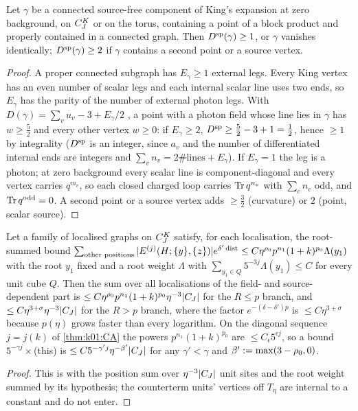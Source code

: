 \begin{lemma}\label{lem:a02:BLK}
Let $\gamma$ be a connected source-free component of King's expansion at zero background, on $C^{K}_{J}$ or on the torus, containing a point of a block product and properly contained in a connected graph. Then $D^{\mathrm{sp}}(\gamma)\ge1$, or $\gamma$ vanishes identically; $D^{\mathrm{sp}}(\gamma)\ge2$ if $\gamma$ contains a second point or a source vertex.
\end{lemma}
\begin{proof}
A proper connected subgraph has $E_\gamma\ge1$ external legs. Every King vertex has an even number of scalar legs and each internal scalar line uses two ends, so $E_\gamma$ has the parity of the number of external photon legs. With $D(\gamma)=\sum_vu_v-3+E_\gamma/2$ \cite[(3.30)--(3.31)]{K1}, a point with a photon field whose line lies in $\gamma$ has $w\ge\frac52$ and every other vertex $w\ge0$: if $E_\gamma\ge2$, $D^{\mathrm{sp}}\ge\frac52-3+1=\frac12$, hence $\ge1$ by integrality ($D^{\mathrm{sp}}$ is an integer, since $a_v$ and the number of differentiated internal ends are integers and $\sum_vn_v=2\#\text{lines}+E_\gamma$). If $E_\gamma=1$ the leg is a photon; at zero background every scalar line is component-diagonal and every vertex carries $q^{m_v}$, so each closed charged loop carries $\operatorname{Tr} q^{n_c}$ with $\sum_cn_c$ odd, and $\operatorname{Tr} q^{\mathrm{odd}}=0$. A second point or a source vertex adds $\ge\frac32$ (curvature) or $2$ (point, scalar source).
\end{proof}

\begin{lemma}\label{lem:a02:SC}
Let a family of localised graphs on $C^{K}_{J}$ satisfy, for each localisation, the root-summed bound $\sum_{\text{other positions}}|E^{(j)}(H;\{y\},\{z\})|e^{\delta'\operatorname{dist}}\le C\eta^{\rho_0}p^{n_1}(1+k)^{p_0}\Lambda(y_1)$ with the root $y_1$ fixed and a root weight $\Lambda$ with $\sum_{y_1\in Q}5^{-3j}\Lambda(y_1)\le C$ for every unit cube $Q$. Then the sum over all localisations of the field- and source-dependent part is $\le C\eta^{\rho_0}p^{n_1}(1+k)^{p_0}\eta^{-3}|C_J|$ for the $R\le p$ branch, and $\le C\eta^{3+\sigma}\eta^{-3}|C_J|$ for the $R>p$ branch, where the factor $e^{-(\delta-\delta')p}$ is $\le C\eta^{3+\sigma}$ because $p(\eta)$ grows faster than every logarithm. On the diagonal sequence $j=j(k)$ of \cref{thm:k01:CA} the powers $p^{n_1}(1+k)^{p_0}$ are $\le C_\epsilon5^{\epsilon j}$, so a bound $5^{-\gamma j}\times$(this) is $\le C5^{-\gamma'j}\eta^{-\beta'}|C_J|$ for any $\gamma'<\gamma$ and $\beta':=\max(3-\rho_0,0)$.
\end{lemma}
\begin{proof}
This is \cite[(3.40)--(3.42)]{K1} with the position sum over $\eta^{-3}|C_J|$ unit sites and the root weight summed by its hypothesis; the counterterm units' vertices off $T_\eta$ are internal to a constant and do not enter.
\end{proof}

